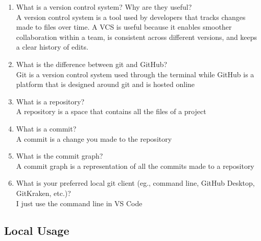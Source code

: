 \documentclass[10pt,twocolumn]{article}
\begin{document}
\begin{enumerate}
    \item What is a version control system? Why are they useful?\\
    
    A version control system is a tool used by developers that tracks changes made to files over time. A VCS is useful because it enables smoother collaboration within a team, is consistent across different versions, and keeps a clear history of edits.\\
    
    \item What is the difference between git and GitHub?\\

    Git is a version control system used through the terminal while GitHub is a platform that is designed around git and is hosted online\\
    
    \item What is a repository?\\

    A repository is a space that contains all the files of a project\\
    
    \item What is a commit?\\

    A commit is a change you made to the repository \\
    
    \item What is the commit graph?\\

    A commit graph is a representation of all the commits made to a repository\\
    
    \item What is your preferred local git client (eg., command line, GitHub Desktop, GitKraken, etc.)?\\

    I just use the command line in VS Code\\
\end{enumerate}

\subsection{Local Usage}
\end{document}

